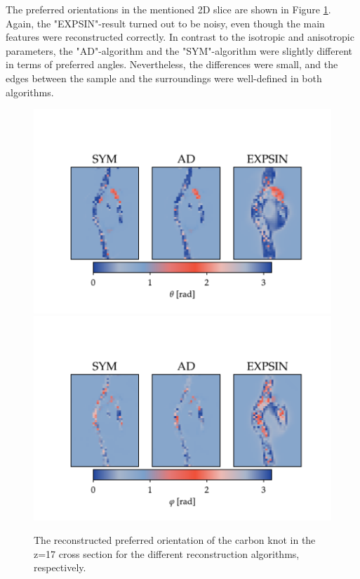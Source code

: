 \clearpage
The preferred orientations in the mentioned 2D slice are shown in Figure \ref{fig:carbon_knot_reconstruction_2D_angles}. %
Again, the "EXPSIN"-result turned out to be noisy, even though the main features were reconstructed correctly.
In contrast to the isotropic and anisotropic parameters,
the "AD"-algorithm and the "SYM"-algorithm were slightly different in terms of preferred angles.
Nevertheless, the differences were small, and the edges between the sample and the surroundings were well-defined in both algorithms.

\begin{figure}[h!]
    \centering

    \includegraphics[trim = {0 0 0 2.0cm}, clip, width = 1\textwidth]{./svg-inkscape/ck_slices_theta_svg-tex.pdf}
    \includegraphics[trim = {0 0 0 2.0cm}, clip, width = 1\textwidth]{./svg-inkscape/ck_slices_phi_svg-tex.pdf}
    \caption[Slice of Reconstructed Orientation for Carbon Knot]{  The reconstructed preferred orientation of the carbon knot in the z=17 cross section for the different reconstruction algorithms, respectively. }
    \label{fig:carbon_knot_reconstruction_2D_angles}
\end{figure}




